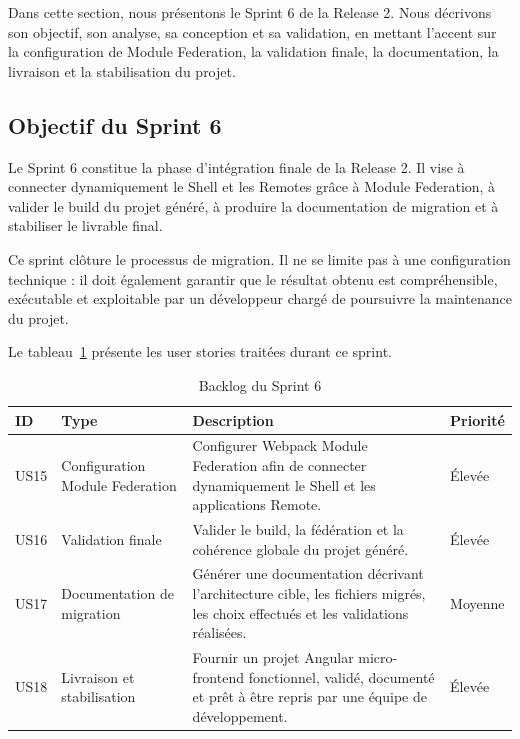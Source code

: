 Dans cette section, nous présentons le Sprint 6 de la Release 2. Nous décrivons son objectif, son analyse, sa conception et sa validation, en mettant l'accent sur la configuration de Module Federation, la validation finale, la documentation, la livraison et la stabilisation du projet.

\subsection{Objectif du Sprint 6}

Le Sprint 6 constitue la phase d'intégration finale de la Release 2. Il vise à connecter dynamiquement le Shell et les Remotes grâce à Module Federation, à valider le build du projet généré, à produire la documentation de migration et à stabiliser le livrable final.

Ce sprint clôture le processus de migration. Il ne se limite pas à une configuration technique : il doit également garantir que le résultat obtenu est compréhensible, exécutable et exploitable par un développeur chargé de poursuivre la maintenance du projet.

Le tableau~\ref{tab:backlog-sprint6-release2} présente les user stories traitées durant ce sprint.

\begingroup
\renewcommand{\arraystretch}{1.12}
\setlength{\tabcolsep}{4pt}
\begin{longtable}{|p{1.0cm}|p{3.1cm}|p{6.55cm}|p{1.55cm}|}
\caption{Backlog du Sprint 6}\label{tab:backlog-sprint6-release2}\\
\hline
\textbf{ID} & \textbf{Type} & \textbf{Description} & \textbf{Priorité} \\
\hline
US15 & Configuration Module Federation & Configurer Webpack Module Federation afin de connecter dynamiquement le Shell et les applications Remote. & Élevée \\
\hline
US16 & Validation finale & Valider le build, la fédération et la cohérence globale du projet généré. & Élevée \\
\hline
US17 & Documentation de migration & Générer une documentation décrivant l'architecture cible, les fichiers migrés, les choix effectués et les validations réalisées. & Moyenne \\
\hline
US18 & Livraison et stabilisation & Fournir un projet Angular micro-frontend fonctionnel, validé, documenté et prêt à être repris par une équipe de développement. & Élevée \\
\hline
\end{longtable}
\endgroup


